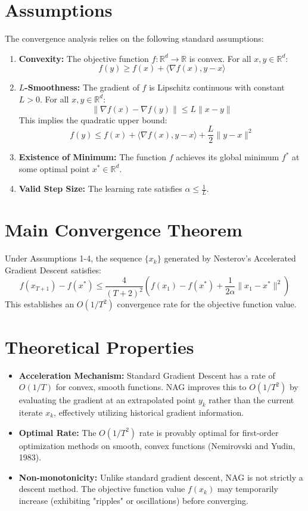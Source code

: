 \documentclass[11pt]{article}
\begin{document}
\section*{Assumptions}
The convergence analysis relies on the following standard assumptions:
\begin{enumerate}
    \item \textbf{Convexity:} The objective function $f: \mathbb{R}^d \to \mathbb{R}$ is convex. For all $x, y \in \mathbb{R}^d$:
    $$f(y) \ge f(x) + \langle \nabla f(x), y - x \rangle$$
    \item \textbf{$L$-Smoothness:} The gradient of $f$ is Lipschitz continuous with constant $L > 0$. For all $x, y \in \mathbb{R}^d$:
    $$\|\nabla f(x) - \nabla f(y)\| \le L\|x - y\|$$
    This implies the quadratic upper bound:
    $$f(y) \le f(x) + \langle \nabla f(x), y - x \rangle + \frac{L}{2}\|y - x\|^2$$
    \item \textbf{Existence of Minimum:} The function $f$ achieves its global minimum $f^*$ at some optimal point $x^* \in \mathbb{R}^d$.
    \item \textbf{Valid Step Size:} The learning rate satisfies $\alpha \leq \frac{1}{L}$.
\end{enumerate}

\section*{Main Convergence Theorem}
Under Assumptions 1-4, the sequence $\{x_k\}$ generated by Nesterov's Accelerated Gradient Descent satisfies:
$$f(x_{T+1}) - f(x^*) \le \frac{4}{(T+2)^2} \left( f(x_1) - f(x^*) + \frac{1}{2\alpha} \|x_1 - x^*\|^2 \right)$$
This establishes an $O(1/T^2)$ convergence rate for the objective function value.

\section*{Theoretical Properties}
\begin{itemize}
    \item \textbf{Acceleration Mechanism:} Standard Gradient Descent has a rate of $O(1/T)$ for convex, smooth functions. NAG improves this to $O(1/T^2)$ by evaluating the gradient at an extrapolated point $y_k$ rather than the current iterate $x_k$, effectively utilizing historical gradient information.
    \item \textbf{Optimal Rate:} The $O(1/T^2)$ rate is provably optimal for first-order optimization methods on smooth, convex functions (Nemirovski and Yudin, 1983).
    \item \textbf{Non-monotonicity:} Unlike standard gradient descent, NAG is not strictly a descent method. The objective function value $f(x_k)$ may temporarily increase (exhibiting "ripples" or oscillations) before converging.
\end{itemize}
\end{document}
